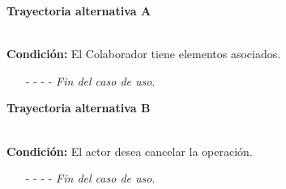 	\hypertarget{CU3-3:TAA}{\textbf{Trayectoria alternativa A}}\\
	\noindent \textbf{Condición:} El Colaborador tiene elementos asociados.
	\begin{enumerate}
		\UCpaso[\UCsist] Muestra el mensaje  en la pantalla .
		\item[- -] - - {\em {Fin del caso de uso}}.%
	\end{enumerate}
	\hypertarget{CU3-3:TAB}{\textbf{Trayectoria alternativa B}}\\
	\noindent \textbf{Condición:} El actor desea cancelar la operación.
	\begin{enumerate}
		\UCpaso[\UCactor] Solicita cancelar la operación oprimiendo el botón  de la ventana emergente.
		\UCpaso[\UCsist] Muestra la pantalla .
		\item[- -] - - {\em {Fin del caso de uso}}.%
	\end{enumerate}
